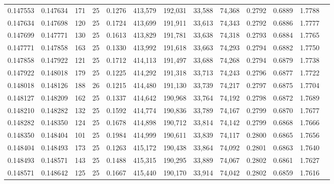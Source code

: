 \begin{tabular}{rrrrrrrrrrrrr}
0.147553 & 0.147634 &   171 &  25 &                                     0.1276 & 413,579 & 192,031 &  33,588 &  74,368 & 0.2792 & 0.6889 & 1.7788 \\
0.147634 & 0.147698 &   120 &  25 &                                     0.1724 & 413,699 & 191,911 &  33,613 &  74,343 & 0.2792 & 0.6886 & 1.7777 \\
0.147699 & 0.147771 &   130 &  25 &                                     0.1613 & 413,829 & 191,781 &  33,638 &  74,318 & 0.2793 & 0.6884 & 1.7765 \\
0.147771 & 0.147858 &   163 &  25 &                                     0.1330 & 413,992 & 191,618 &  33,663 &  74,293 & 0.2794 & 0.6882 & 1.7750 \\
0.147858 & 0.147922 &   121 &  25 &                                     0.1712 & 414,113 & 191,497 &  33,688 &  74,268 & 0.2794 & 0.6879 & 1.7738 \\
0.147922 & 0.148018 &   179 &  25 &                                     0.1225 & 414,292 & 191,318 &  33,713 &  74,243 & 0.2796 & 0.6877 & 1.7722 \\
0.148018 & 0.148126 &   188 &  26 &                                     0.1215 & 414,480 & 191,130 &  33,739 &  74,217 & 0.2797 & 0.6875 & 1.7704 \\
0.148127 & 0.148209 &   162 &  25 &                                     0.1337 & 414,642 & 190,968 &  33,764 &  74,192 & 0.2798 & 0.6872 & 1.7689 \\
0.148210 & 0.148282 &   132 &  25 &                                     0.1592 & 414,774 & 190,836 &  33,789 &  74,167 & 0.2799 & 0.6870 & 1.7677 \\
0.148282 & 0.148350 &   124 &  25 &                                     0.1678 & 414,898 & 190,712 &  33,814 &  74,142 & 0.2799 & 0.6868 & 1.7666 \\
0.148350 & 0.148404 &   101 &  25 &                                     0.1984 & 414,999 & 190,611 &  33,839 &  74,117 & 0.2800 & 0.6865 & 1.7656 \\
0.148404 & 0.148493 &   173 &  25 &                                     0.1263 & 415,172 & 190,438 &  33,864 &  74,092 & 0.2801 & 0.6863 & 1.7640 \\
0.148493 & 0.148571 &   143 &  25 &                                     0.1488 & 415,315 & 190,295 &  33,889 &  74,067 & 0.2802 & 0.6861 & 1.7627 \\
0.148571 & 0.148642 &   125 &  25 &                                     0.1667 & 415,440 & 190,170 &  33,914 &  74,042 & 0.2802 & 0.6859 & 1.7616 \\

\end{tabular}
